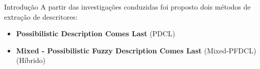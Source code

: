 \documentclass[brazil]{beamer}
\begin{document}
%
%
%

\begin{frame}{Introdução}
  A partir das investigações conduzidas foi proposto dois métodos de extração de descritores:

  \begin{itemize}
    \item \textbf{Possibilistic Description Comes Last} (PDCL)
    \item \textbf{Mixed - Possibilistic Fuzzy Description Comes Last} (Mixed-PFDCL) (Híbrido)
  \end{itemize} 
\end{frame}

%
%
\end{document}
